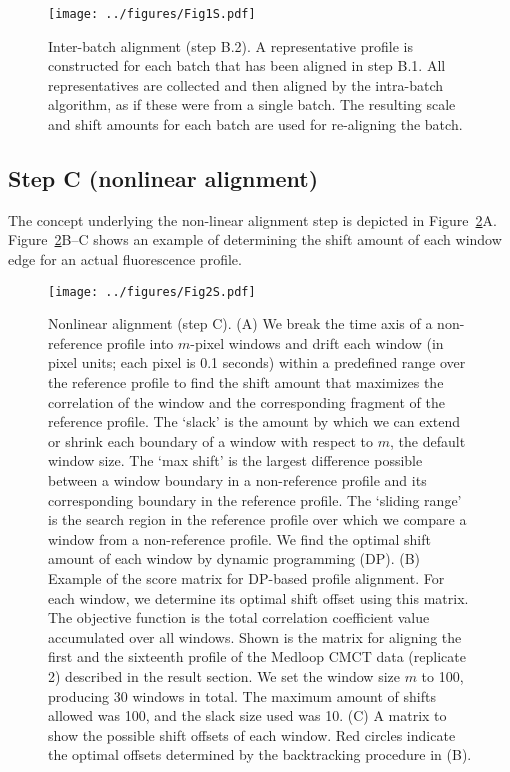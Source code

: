 \documentclass[letter]{bioinfo}
\begin{document}
\begin{figure}[!h]
\centering
    \texttt{[image: ../figures/Fig1S.pdf]}
\caption{Inter-batch alignment (step B.2). A representative profile is constructed for each batch that has been aligned in step B.1. All representatives are collected and then aligned by the intra-batch algorithm, as if these were from a single batch. The resulting scale and shift amounts for each batch are used for re-aligning the batch.
}
\label{f:fine-tuning}
\end{figure}

\subsection{Step C (nonlinear alignment)}
The concept underlying the non-linear alignment step is depicted in Figure~\ref{f:nonlinear}A. Figure~\ref{f:nonlinear}B--C shows an example of determining the shift amount of each window edge for an actual fluorescence profile.

\begin{figure}
\centering
    \texttt{[image: ../figures/Fig2S.pdf]}
\caption{Nonlinear alignment (step C). (A) We break the time axis of a non-reference profile into $m$-pixel windows and drift each window (in pixel units; each pixel is 0.1 seconds) within a predefined range over the reference profile to find the shift amount that maximizes the correlation of the window and the corresponding fragment of the reference profile. The `slack' is the amount by which we can extend or shrink each boundary of a window with respect to $m$, the default window size. The `max shift' is the largest difference possible between a window boundary in a non-reference profile and its corresponding boundary in the reference profile. The `sliding range' is the search region in the reference profile over which we compare a window from a non-reference profile. We find the optimal shift amount of each window by dynamic programming (DP). (B) Example of the score matrix for DP-based profile alignment. For each window, we determine its optimal shift offset using this matrix. The objective function is the total correlation coefficient value accumulated over all windows. Shown is the matrix for aligning the first and the sixteenth profile of the Medloop CMCT data (replicate 2) described in the result section. We set the window size $m$ to 100, producing 30 windows in total. The maximum amount of shifts allowed was 100, and the slack size used was 10. (C) A matrix to show the possible shift offsets of each window. Red circles indicate the optimal offsets determined by the backtracking procedure in (B).}
\label{f:nonlinear}
\end{figure}
\end{document}
